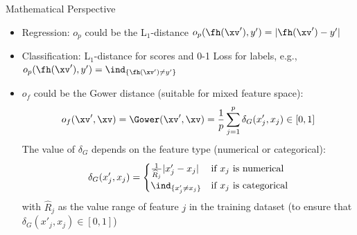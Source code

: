 \documentclass[11pt,compress,t,notes=noshow, aspectratio=169, xcolor=table, usenames,dvipsnames]{beamer}
\begin{document}
\begin{frame}{Mathematical Perspective }
	
	\begin{itemize}
		\item Regression: $o_p$ could be the L$_1$-distance $o_p(\fh(\xv'), y') = |\fh(\xv')-y'|$
		\item Classification:
		L$_1$-distance for scores and 0-1 Loss for labels, e.g., $o_p(\fh(\xv'), y') = \ind_{\{ \fh(\xv') \neq y' \}}$
		\pause
		\item $o_f$ could be the Gower distance (suitable for mixed feature space):
		$$o_f(\xv', \xv) = \Gower(\xv', \xv) = \frac{1}{p}\sum_{j = 1}^{p} \delta_G(x'_j, x_j)	\in [0, 1]$$
		The value of $\delta_G$ depends on the feature type (numerical or categorical):
		\begin{equation*}
		\delta_G(x'_j, x_j) =
		\begin{cases}
		\frac{1}{\widehat{R}_j}|x_j'- x_j| & \text{if $x_j$ is numerical} \\
		\ind_{\{ x_j' \neq x_j \}} & \text{if $x_j$ is categorical}
		\end{cases}
		\end{equation*}
		with $\widehat{R}_j$ as the value range of feature $j$ in the training dataset (to ensure that $\delta_G(x'_j, x_j)	\in [0, 1]$)
	\end{itemize}
\end{frame}
\end{document}
